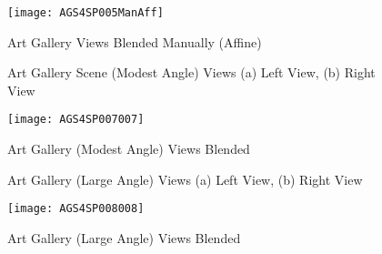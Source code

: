 \begin{figure}[h]
\centering
\texttt{[image: AGS4SP005ManAff]}
\caption{Art Gallery Views Blended Manually (Affine)}
\label{ArtGallery4StitchedManual5}
\end{figure}


\begin{figure}[h]
\centering
{}
\caption{Art Gallery Scene (Modest Angle) Views (a) Left View, (b) Right View}
\label{ArtGallery4Images7}
\end{figure}

\begin{figure}[h]
\centering
\texttt{[image: AGS4SP007007]}
\caption{Art Gallery (Modest Angle) Views Blended}
\label{ArtGallery4Stitched7}
\end{figure}


\begin{figure}[h]
\centering
{}
\caption{Art Gallery (Large Angle) Views (a) Left View, (b) Right View}
\label{ArtGallery4Images8}
\end{figure}

\begin{figure}[h]
\centering
\texttt{[image: AGS4SP008008]}
\caption{Art Gallery (Large Angle) Views Blended}
\label{ArtGallery4Stitched8}
\end{figure}




